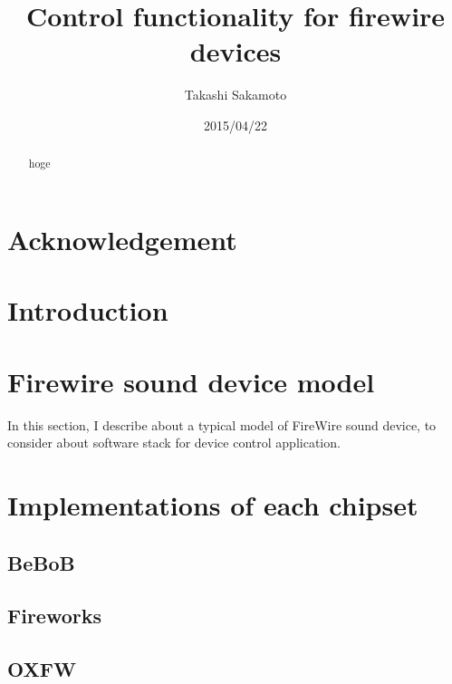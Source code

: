 \documentclass[onecolumn]{article}
\begin{document}

\title{Control functionality for firewire devices}
\author{Takashi Sakamoto}
\date{2015/04/22}
\maketitle{}

\begin{abstract}

hoge

\end{abstract}

\section*{Acknowledgement}

\newpage

\tableofcontents

\newpage


\section{Introduction}


\section{Firewire sound device model}

In this section, I describe about a typical model of FireWire sound device, to consider about software stack for device control application.




\section{Implementations of each chipset}

\subsection{BeBoB}

\subsection{Fireworks}

\subsection{OXFW}
\end{document}
